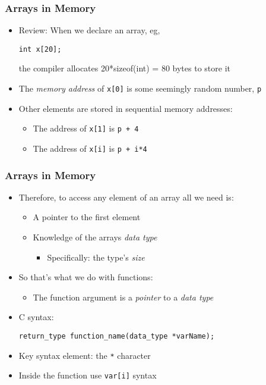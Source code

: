 \documentclass[14pt]{beamer}
\begin{document}
\begin{frame}[fragile]
\frametitle{Arrays in Memory}
\begin{itemize}
\item Review: When we declare an array, eg,
\begin{lstlisting}[style=CStyle]
int x[20];
\end{lstlisting}
the compiler allocates 20*sizeof(int) = 80 bytes to store it
\item The \textit{memory address} of \texttt{x[0]} is some seemingly random number, \texttt{p}
\item Other elements are stored in sequential memory addresses:
	\begin{itemize}
		\item The address of \texttt{x[1]} is \texttt{p + 4}
		\item The address of \texttt{x[i]} is \texttt{p + i*4}
	\end{itemize}
\end{itemize}
\end{frame}

\begin{frame}[fragile]
\frametitle{Arrays in Memory}
\begin{itemize}
\item Therefore, to access any element of an array all we need is:
	\begin{itemize}
		\item A pointer to the first element
		\item Knowledge of the arrays \textit{data type}
			\begin{itemize}
				\item Specifically: the type's \textit{size}
			\end{itemize}
	\end{itemize}
\pause
\item So that's what we do with functions:
	\begin{itemize}
		\item The function argument is a \textit{pointer} to a \textit{data type}
	\end{itemize}
\pause
\item C syntax:
\begin{lstlisting}[style=CStyle]
return_type function_name(data_type *varName);
\end{lstlisting}
\item Key syntax element: the \texttt{*} character
\pause
\item Inside the function use \texttt{var[i]} syntax
\end{itemize}
\end{frame}
\end{document}
